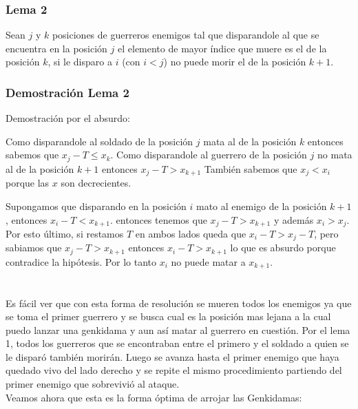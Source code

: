     		\subsubsection*{Lema 2}

    			Sean $j$ y $k$ posiciones de guerreros enemigos tal que disparandole al que se encuentra en la posición $j$ el elemento de mayor índice que muere es el de la posición $k$, si le disparo a $i$ (con $i < j$) no puede morir el de la posición $k+1$.


    		\subsubsection*{Demostración Lema 2}
    			Demostración por el absurdo:

    			Como disparandole al soldado de la posición $j$ mata al de la posición $k$ entonces sabemos que $x_{j} - T \leq x_{k}$.
    			Como disparandole al guerrero de la posición $j$ no mata al de la posición $k+1$ entonces $x_{j} - T > x_{k+1}$
    			También sabemos que $x_{j} < x_{i}$ porque las $x$ son decrecientes.

    			Supongamos que disparando en la posición $i$ mato al enemigo de la posición $k+1$, entonces $x_{i} - T < x_{k+1}$.
    			entonces tenemos que $x_{j} - T > x_{k+1}$ y además $x_{i} > x_{j}$. Por esto último, si restamos $T$ en ambos lados queda que $x_{i} - T > x_{j} - T$, pero sabiamos que $x_{j} - T > x_{k+1}$ entonces $x_{i} - T > x_{k+1}$ lo que es absurdo porque contradice la hipótesis. 
    			Por lo tanto $x_{i}$ no puede matar a $x_{k+1}$. \\
    			\\
    			\\


		Es fácil ver que con esta forma de resolución se mueren todos los enemigos ya que se toma el primer guerrero y se busca cual es la posición mas lejana a la cual puedo lanzar una genkidama y aun así matar al guerrero en cuestión. Por el lema 1, todos los guerreros que se encontraban entre el primero y el soldado a quien se le disparó también morirán. Luego se avanza hasta el primer enemigo que haya quedado vivo del lado derecho y se repite el mismo procedimiento partiendo del primer enemigo que sobrevivió al ataque. \\ 


		Veamos ahora que esta es la forma óptima de arrojar las Genkidamas:\\


